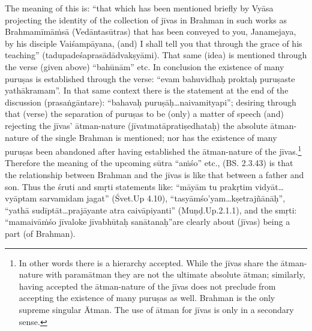 The meaning of this is: “that which has been mentioned briefly by Vyāsa projecting the identity of the collection of jīvas in Brahman in such works as Brahmamīmāṁsā (Vedāntasūtras) that has been conveyed to you, Janamejaya, by his disciple Vaiśampāyana, (and) I shall tell you that through the grace of his teaching” (tadupadeśaprasādādvakṣyāmi). That same (idea) is mentioned through the verse (given above) “bahūnām” etc. In conclusion the existence of many puruṣas is established through the verse: “evam bahuvidhaḥ proktaḥ puruṣaste yathākramam”. In that same context there is the statement at the end of the discussion (prasaṅgāntare): “bahavaḥ puruṣāḥ…naivamityapi”; desiring through that (verse) the separation of puruṣas to be (only) a matter of speech (and) rejecting the jīvas’ ātman-nature (jīvatmatāpratiṣedhataḥ) the absolute ātman-nature of the single Brahman is mentioned; nor has the existence of many puruṣas been abandoned after having established the ātman-nature of the jīvas.\footnote{In other words there is a hierarchy accepted. While the jīvas share the ātman-nature with paramātman they are not the ultimate absolute ātman; similarly, having accepted the ātman-nature of the jīvas does not preclude from accepting the existence of many puruṣas as well. Brahman is the only supreme singular Ātman. The use of ātman for jīvas is only in a secondary sense.} Therefore the meaning of the upcoming sūtra “aṁśo” etc., (BS. 2.3.43) is that the relationship between Brahman and the jīvas is like that between a father and son. Thus the śruti and smṛti statements like: “māyām tu prakṛtim vidyāt…vyāptam sarvamidam jagat” (Śvet.Up 4.10), “tasyāmśo’yam…kṣetrajñānāḥ”, “yathā sudīptāt…prajāyante atra caivāpiyanti” (Muṇḍ.Up.2.1.1), and the smṛti: “mamaivāṁśo jīvaloke jīvabhūtaḥ sanātanaḥ”are clearly about (jīvas) being a part (of Brahman). 



